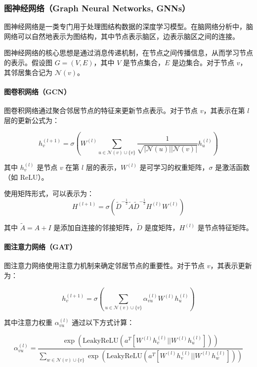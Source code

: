 \documentclass[12pt,a4paper]{article}
\begin{document}
\subsubsection{图神经网络（Graph Neural Networks, GNNs）}

图神经网络是一类专门用于处理图结构数据的深度学习模型。在脑网络分析中，脑网络可以自然地表示为图结构，其中节点表示脑区，边表示脑区之间的连接。

图神经网络的核心思想是通过消息传递机制，在节点之间传播信息，从而学习节点的表示。假设图 $G = (V, E)$，其中 $V$ 是节点集合，$E$ 是边集合。对于节点 $v$，其邻居集合记为 $\mathcal{N}(v)$。

\paragraph{图卷积网络（GCN）}
图卷积网络通过聚合邻居节点的特征来更新节点表示。对于节点 $v$，其表示在第 $l$ 层的更新公式为：

\begin{equation}
h_v^{(l+1)} = \sigma\left(W^{(l)} \sum_{u \in \mathcal{N}(v) \cup \{v\}} \frac{1}{\sqrt{|\mathcal{N}(u)||\mathcal{N}(v)|}} h_u^{(l)}\right)
\end{equation}

其中 $h_v^{(l)}$ 是节点 $v$ 在第 $l$ 层的表示，$W^{(l)}$ 是可学习的权重矩阵，$\sigma$ 是激活函数（如 ReLU）。

使用矩阵形式，可以表示为：
\begin{equation}
H^{(l+1)} = \sigma\left(\tilde{D}^{-\frac{1}{2}}\tilde{A}\tilde{D}^{-\frac{1}{2}} H^{(l)} W^{(l)}\right)
\end{equation}

其中 $\tilde{A} = A + I$ 是添加自连接的邻接矩阵，$\tilde{D}$ 是度矩阵，$H^{(l)}$ 是节点特征矩阵。

\paragraph{图注意力网络（GAT）}
图注意力网络使用注意力机制来确定邻居节点的重要性。对于节点 $v$，其表示更新为：

\begin{equation}
h_v^{(l+1)} = \sigma\left(\sum_{u \in \mathcal{N}(v) \cup \{v\}} \alpha_{vu}^{(l)} W^{(l)} h_u^{(l)}\right)
\end{equation}

其中注意力权重 $\alpha_{vu}^{(l)}$ 通过以下方式计算：

\begin{equation}
\alpha_{vu}^{(l)} = \frac{\exp\left(\text{LeakyReLU}\left(a^T [W^{(l)} h_v^{(l)} || W^{(l)} h_u^{(l)}]\right)\right)}{\sum_{w \in \mathcal{N}(v) \cup \{v\}} \exp\left(\text{LeakyReLU}\left(a^T [W^{(l)} h_v^{(l)} || W^{(l)} h_w^{(l)}]\right)\right)}
\end{equation}
\end{document}
